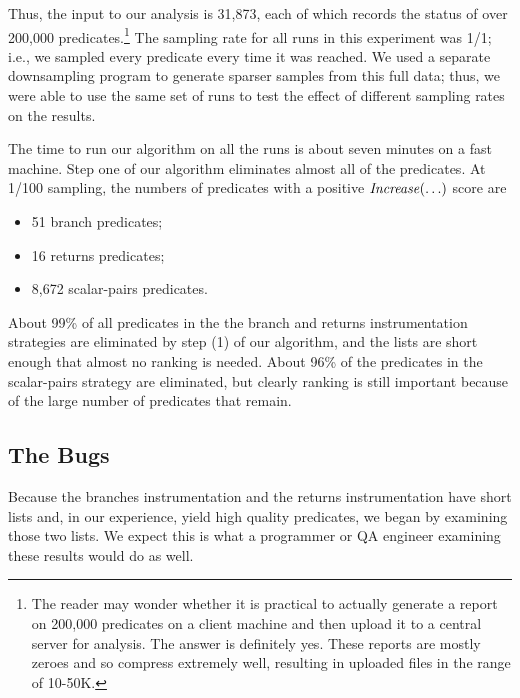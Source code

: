 Thus, the input to our analysis is 31,873, each of which records the
status of over 200,000 predicates.\footnote{The reader may wonder
whether it is practical to actually generate a report on 200,000
predicates on a client machine and then upload it to a central server
for analysis.  The answer is definitely yes.  These reports are mostly
zeroes and so compress extremely well, resulting in uploaded files in
the range of 10-50K.}  The sampling rate for all runs in this
experiment was 1/1; i.e., we sampled every predicate every time it was
reached.  We used a separate downsampling program to generate sparser
samples from this full data; thus, we were able to use the same set of
runs to test the effect of different sampling rates on the results.

The time to run our algorithm on all the runs is about seven minutes on
a fast machine.
Step one of our algorithm eliminates almost all of the predicates.  At
1/100 sampling, the numbers of predicates with a positive
$\mbox{\textit{Increase}}(\ldots)$ score are

\begin{itemize}
\item 51 branch predicates;

\item 16 returns predicates;

\item 8,672 scalar-pairs predicates.
\end{itemize}
About 99\% of all predicates in the the branch and returns
instrumentation strategies are eliminated by step (1) of our
algorithm, and the lists are short enough that almost no ranking is
needed.  About 96\% of the predicates in the scalar-pairs strategy are
eliminated, but clearly ranking is still important because of the
large number of predicates that remain.

\subsection{The Bugs}

Because the branches instrumentation and the returns instrumentation
have short lists and, in our experience, yield high quality
predicates, we began by examining those two lists.  We expect this is
what a programmer or QA engineer examining these results would do as well.


